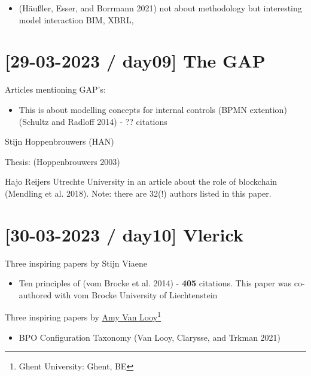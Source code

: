 \documentclass[
  letterpaper,
  DIV=11,
  numbers=noendperiod]{scrreprt}
\providecommand{\tightlist}{%
  \setlength{\itemsep}{0pt}\setlength{\parskip}{0pt}}\usepackage{longtable,booktabs,array}
\begin{document}
\begin{itemize}
\tightlist
\item
  (Häußler, Esser, and Borrmann 2021) not about methodology but
  interesting model interaction BIM, XBRL,
\end{itemize}

\hypertarget{day09-the-gap}{%
\section{{[}29-03-2023 / day09{]} The GAP}\label{day09-the-gap}}

Articles mentioning GAP's:

\begin{itemize}
\tightlist
\item
  This is about modelling concepts for internal controls
  (BPMN extention)(Schultz and Radloff 2014) - ?? citations
\end{itemize}

Stijn
Hoppenbrouwers
(HAN)

Thesis: (Hoppenbrouwers 2003)

Hajo Reijers Utrechte University in an article about the role of
blockchain (Mendling et al. 2018). Note: there are 32(!) authors listed
in this paper.

\hypertarget{day10-vlerick}{%
\section{{[}30-03-2023 / day10{]} Vlerick}\label{day10-vlerick}}

Three inspiring papers by Stijn
Viaene

\begin{itemize}
\tightlist
\item
  Ten principles of (vom Brocke et al. 2014) - \textbf{405} citations.
  This paper was co-authored with vom
  Brocke
  University of Liechtenstein
\end{itemize}

Three inspiring papers by \href{https://www.amyvanlooy.eu/home}{Amy Van
Looy}\footnote{Ghent
  University: Ghent, BE}

\begin{itemize}
\tightlist
\item
  BPO Configuration Taxonomy (Van Looy, Clarysse, and Trkman 2021)
\end{itemize}
\end{document}
